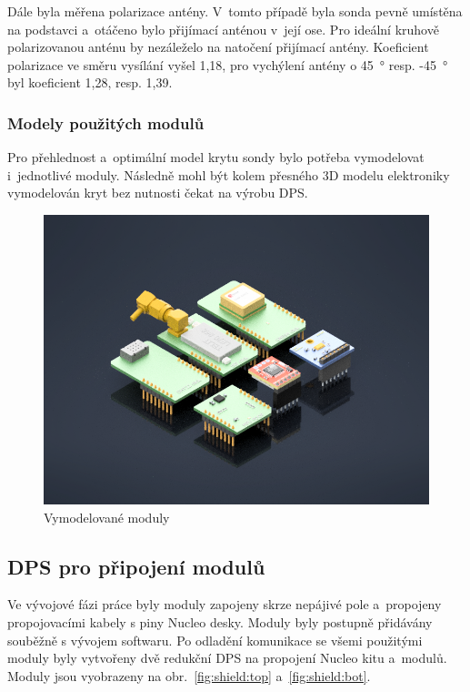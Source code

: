\documentclass[twoside]{ctuthesis}
\theoremstyle{plain}
\theoremstyle{definition}
\theoremstyle{note}
\begin{document}
			Dále byla měřena polarizace antény. V~tomto případě byla sonda pevně umístěna na podstavci a~otáčeno bylo přijímací anténou v~její ose. Pro ideální kruhově polarizovanou anténu by nezáleželo na natočení přijímací antény. Koeficient polarizace ve směru vysílání vyšel 1,18, pro vychýlení antény o 45~° resp. -45~° byl koeficient 1,28, resp. 1,39.

			
			

			\subsubsection{Modely použitých modulů}
			Pro přehlednost a~optimální model krytu sondy bylo potřeba vymodelovat i~jednotlivé moduly. Následně mohl být kolem přesného 3D modelu elektroniky vymodelován kryt bez nutnosti čekat na výrobu DPS.
			\begin{figure}[hbtp]
				\centering
				\includegraphics[width=.7\linewidth]{Figures/modules_assembly.png} 
				\caption{Vymodelované moduly}
				\label{fig:modules:assembly}
			\end{figure}
		

		
		\subsection{DPS pro připojení modulů}
		Ve vývojové fázi práce byly moduly zapojeny skrze nepájivé pole a~propojeny propojovacími kabely s piny Nucleo desky. Moduly byly postupně přidávány souběžně s vývojem softwaru. Po odladění komunikace se všemi použitými moduly byly vytvořeny dvě redukční DPS na propojení Nucleo kitu a~modulů. Moduly jsou vyobrazeny na obr.~\ref{fig:shield:top} a~\ref{fig:shield:bot}. 
\end{document}
